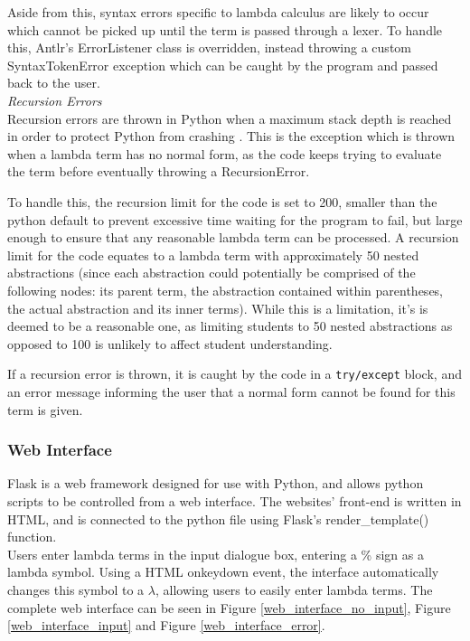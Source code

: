 \documentclass[a4paper,12pt]{report}
\begin{document}
Aside from this, syntax errors specific to lambda calculus are likely to occur which cannot be picked up until the term is passed through a lexer. To handle this, Antlr's ErrorListener class is overridden, instead throwing a custom SyntaxTokenError exception which can be caught by the program and passed back to the user.\\

\textit{Recursion Errors}\\
Recursion errors are thrown in Python when a maximum stack depth is reached in order to protect Python from crashing \cite{PythonStack2019}. This is the exception which is thrown when a lambda term has no normal form, as the code keeps trying to evaluate the term before eventually throwing a RecursionError.

To handle this, the recursion limit for the code is set to 200, smaller than the python default to prevent excessive time waiting for the program to fail, but large enough to ensure that any reasonable lambda term can be processed. A recursion limit for the code equates to a lambda term with approximately 50 nested abstractions (since each abstraction could potentially be comprised of the following nodes: its parent term, the abstraction contained within parentheses, the actual abstraction and its inner terms). While this is a limitation, it's is deemed to be a reasonable one, as limiting students to 50 nested abstractions as opposed to 100 is unlikely to affect student understanding.

If a recursion error is thrown, it is caught by the code in a \texttt{try/except} block, and an error message informing the user that a normal form cannot be found for this term is given.

\subsubsection{Web Interface}

Flask is a web framework designed for use with Python, and allows python scripts to be controlled from a web interface\cite{FullStack2019}. The websites' front-end is written in HTML, and is connected to the python file using Flask's render_template() function.\\

Users enter lambda terms in the input dialogue box, entering a \% sign as a lambda symbol. Using a HTML onkeydown event, the interface automatically changes this symbol to a $\lambda$, allowing users to easily enter lambda terms. The complete web interface can be seen in Figure \ref{web_interface_no_input}, Figure \ref{web_interface_input} and Figure \ref{web_interface_error}.\\
\end{document}
